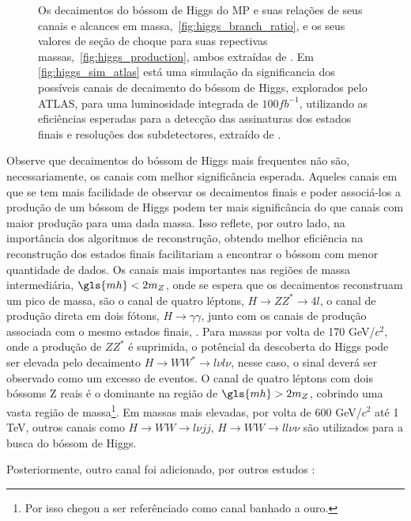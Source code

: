 \begin{figure}[ht!]
\begin{center}
{        }
    \end{center}
\caption[Simulação da significância dos canais de decaimento do bóssom
de Higgs explorados pelos ATLAS, as relações de seus canais e alcances em massa,
e a seção de choque do mesmo.]
{Os decaimentos do bóssom de Higgs do MP e suas relações de
seus canais e alcances em massa,~\ref{fig:higgs_branch_ratio}, e os seus valores de seção de choque para suas
repectivas massas,~\ref{fig:higgs_production}, ambos extraídas de \cite{lhc_higgs_group}. 
Em \ref{fig:higgs_sim_atlas} está uma simulação da significancia dos possíveis canais de decaimento do
bóssom de Higgs, explorados pelo ATLAS, para uma luminosidade integrada de
$100fb^{-1}$, utilizando as eficiências esperadas para a detecção das
assinaturas dos estados finais e resoluções dos subdetectores, extraído de
\cite{ATLAS_TDR2}.}
\end{figure}

Observe que decaimentos do bóssom de Higgs mais frequentes não são,
necessariamente, os canais com melhor significância esperada. Aqueles canais em
que se tem mais facilidade de observar os decaimentos finais e poder associá-los
a produção de um bóssom de Higgs podem ter mais significância do que canais com
maior produção para uma dada massa. Isso reflete, por outro lado, na importância
dos algoritmos de reconstrução, obtendo melhor eficiência na reconstrução dos
estados finais facilitariam a encontrar o bóssom com menor quantidade de dados.
Os canais mais importantes nas regiões de massa intermediária, $\gls{mh}<2m_Z$,
onde se espera que os decaimentos reconstruam um pico de massa, são 
o canal de quatro léptons, $H\rightarrow ZZ^* \rightarrow 4l$, o canal de
produção direta em dois fótons, $H\rightarrow \gamma\gamma$, junto com os
canais de produção associada com o mesmo estados finais, . Para massas por volta
de 170 GeV/$c^2$, onde a produção de $ZZ^*$ é suprimida, o potêncial da descoberta do
Higgs pode ser elevada pelo decaimento $H\rightarrow WW^*\rightarrow l\nu l\nu$,
nesse caso, o sinal deverá ser observado como um excesso de eventos. O canal de
quatro léptons com dois bóssoms Z reais é o dominante na região de
$\gls{mh}>2m_Z$, cobrindo uma vasta região de massa\footnote{Por isso chegou a
ser referênciado como canal banhado a ouro.}. Em massas mais elevadas, por volta de 600 GeV/$c^2$ até 1
TeV, outros canais como $H\rightarrow WW\rightarrow l\nu jj$, $H\rightarrow
WW\rightarrow ll\nu\nu$ são utilizados para a busca do bóssom de Higgs.

Posteriormente, outro canal foi adicionado, por outros estudos
\cite{atlas_tautau,atlas_tautau2}:

